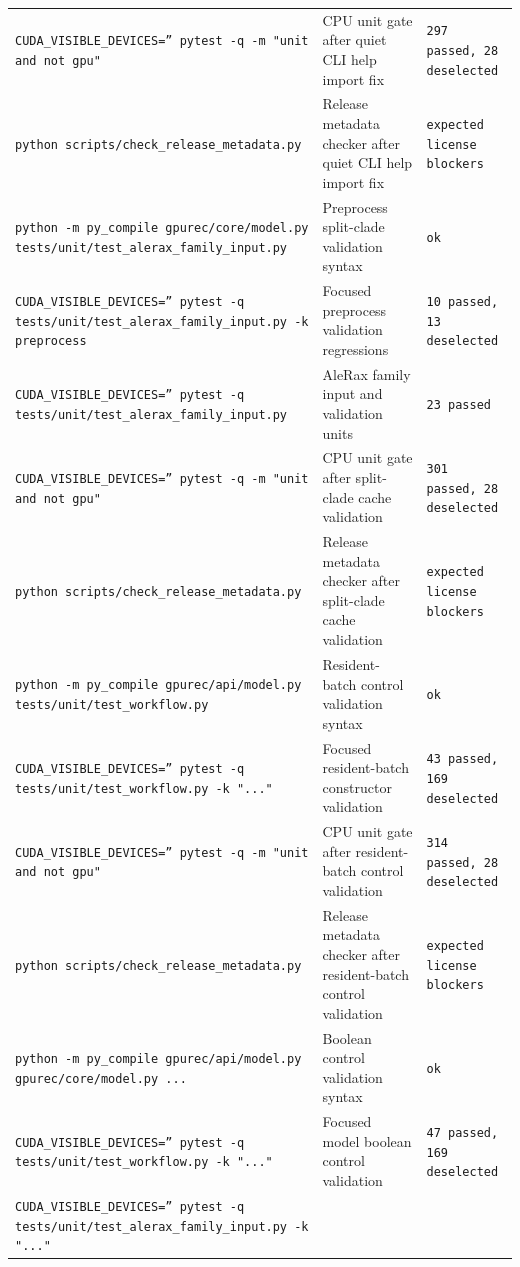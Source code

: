 \documentclass[11pt]{article}
\begin{document}
\begin{center}
\begin{tabular}{lll}
\texttt{CUDA\_VISIBLE\_DEVICES='' pytest -q -m "unit and not gpu"} &
CPU unit gate after quiet CLI help import fix &
\texttt{297 passed, 28 deselected} \\
\texttt{python scripts/check\_release\_metadata.py} &
Release metadata checker after quiet CLI help import fix &
\texttt{expected license blockers} \\
\texttt{python -m py\_compile gpurec/core/model.py tests/unit/test\_alerax\_family\_input.py} &
Preprocess split-clade validation syntax &
\texttt{ok} \\
\texttt{CUDA\_VISIBLE\_DEVICES='' pytest -q tests/unit/test\_alerax\_family\_input.py -k preprocess} &
Focused preprocess validation regressions &
\texttt{10 passed, 13 deselected} \\
\texttt{CUDA\_VISIBLE\_DEVICES='' pytest -q tests/unit/test\_alerax\_family\_input.py} &
AleRax family input and validation units &
\texttt{23 passed} \\
\texttt{CUDA\_VISIBLE\_DEVICES='' pytest -q -m "unit and not gpu"} &
CPU unit gate after split-clade cache validation &
\texttt{301 passed, 28 deselected} \\
\texttt{python scripts/check\_release\_metadata.py} &
Release metadata checker after split-clade cache validation &
\texttt{expected license blockers} \\
\texttt{python -m py\_compile gpurec/api/model.py tests/unit/test\_workflow.py} &
Resident-batch control validation syntax &
\texttt{ok} \\
\texttt{CUDA\_VISIBLE\_DEVICES='' pytest -q tests/unit/test\_workflow.py -k "..."} &
Focused resident-batch constructor validation &
\texttt{43 passed, 169 deselected} \\
\texttt{CUDA\_VISIBLE\_DEVICES='' pytest -q -m "unit and not gpu"} &
CPU unit gate after resident-batch control validation &
\texttt{314 passed, 28 deselected} \\
\texttt{python scripts/check\_release\_metadata.py} &
Release metadata checker after resident-batch control validation &
\texttt{expected license blockers} \\
\texttt{python -m py\_compile gpurec/api/model.py gpurec/core/model.py ...} &
Boolean control validation syntax &
\texttt{ok} \\
\texttt{CUDA\_VISIBLE\_DEVICES='' pytest -q tests/unit/test\_workflow.py -k "..."} &
Focused model boolean control validation &
\texttt{47 passed, 169 deselected} \\
\texttt{CUDA\_VISIBLE\_DEVICES='' pytest -q tests/unit/test\_alerax\_family\_input.py -k "..."} &

\end{tabular}
\end{center}
\end{document}
